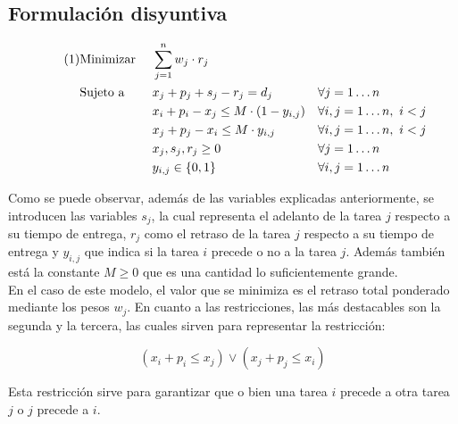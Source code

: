 \documentclass[a4paper,11pt]{article}
\newcommand\numberthis{							%
	\addtocounter{equation}{1}\tag{\theequation}
}
\begin{document}
\subsection{Formulación disyuntiva}
\begin{align*}\numberthis
	\label{eq:formulacion_disyuntiva}
   	&\textrm{Minimizar }	&& \sum_{j=1}^{n}{w_{j} \cdot r_{j}}				&& \\
   	&\textrm{Sujeto a }		&& x_{j} + p_{j} + s_{j} - r_{j} = d_{j}			&& \forall j=1 \ldots n	\\
    &						&& x_{i} + p_{i} - x_{j} \leq M \cdot (1 - y_{i,j})	&& \forall i, j = 1 \ldots n, \ i < j	\\
    &						&& x_{j} + p_{j} - x_{i} \leq M \cdot y_{i,j}		&& \forall i, j = 1 \ldots n, \ i < j	\\
    &						&& x_{j}, s_{j}, r_{j} \geq 0						&& \forall j = 1 \ldots n	\\
    &						&& y_{i,j} \in \{0,1\}								&& \forall i, j = 1 \ldots n	\\
\end{align*}

Como se puede observar, además de las variables explicadas anteriormente, se introducen las variables ${s_{j}}$, la cual representa el adelanto de la tarea $j$ respecto a su tiempo de entrega, ${r_{j}}$ como el retraso de la tarea $j$ respecto a su tiempo de entrega y ${y_{i,j}}$ que indica si la tarea $i$ precede o no a la tarea $j$. Además también está la constante ${M \geq 0}$ que es una cantidad lo suficientemente grande.\\

En el caso de este modelo, el valor que se minimiza es el retraso total ponderado mediante los pesos ${w_{j}}$. En cuanto a las restricciones, las más destacables son la segunda y la tercera, las cuales sirven para representar la restricción:

\begin{equation}
\label{eq:formulacion_disyuntiva_dicotomia}
(x_i+p_i \leq x_j) \lor (x_j+p_j \leq x_i)
\end{equation}

Esta restricción sirve para garantizar que o bien una tarea $i$ precede a otra tarea $j$ o $j$ precede a $i$.
\end{document}
